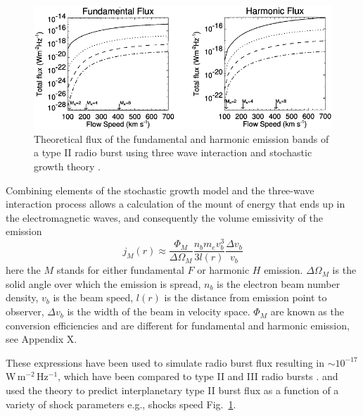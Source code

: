 \begin{figure}[t!]
\begin{center}
\includegraphics[scale=1.1, trim=0cm 0cm 0cm 0.5cm]{images/Cairns2003.pdf}
\caption[Theoretically predicted radio burst fluxes]{Theoretical flux of the fundamental and harmonic emission bands of a type II radio burst using three wave interaction and stochastic growth theory \citet{cairns2003}.}
\label{fig:cairns_emissivity}
\end{center}
\end{figure}
Combining elements of the stochastic growth model and the three-wave interaction process allows a calculation of the mount of energy that ends up in the electromagnetic waves, and consequently the volume emissivity of the emission \citep{robinson1993a, robinson1998}
\begin{equation}
j_M(r) \approx \frac{\Phi_M}{\Delta\Omega_M}\frac{n_b m_e v_b^3}{3l(r)}\frac{\Delta v_b}{v_b}
\end{equation}
here the $M$ stands for either fundamental $F$ or harmonic $H$ emission. $\Delta\Omega_M$ is the solid angle over which the  emission is spread, $n_b$ is the electron beam number density, $v_b$ is the beam speed, $l(r)$ is the distance from emission point to observer, $\Delta v_b$ is the width of the beam in velocity space. $\Phi_M$ are known as the conversion efficiencies and are different for fundamental and harmonic emission, see Appendix X.

These expressions have been used to simulate radio burst flux resulting in $\sim10^{-17}$\,W\,m$^{-2}$\,Hz$^{-1}$, which have been compared to type II and III radio bursts \citep{schmidt2012, knock2001}. \citet{knock2003} and \citet{cairns2003} used the theory to predict interplanetary type II burst flux as a function of a variety of shock parameters e.g., shocks speed Fig.~\ref{fig:cairns_emissivity}.

